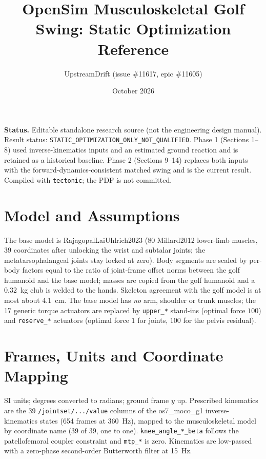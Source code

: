\documentclass[11pt,a4paper]{article}
\title{OpenSim Musculoskeletal Golf Swing: Static Optimization Reference}
\author{UpstreamDrift (issue \#11617, epic \#11605)}
\date{October 2026}
\begin{document}
\maketitle

\noindent\textbf{Status.} Editable standalone research source (not the engineering design manual). Result status: \texttt{STATIC\_OPTIMIZATION\_ONLY\_NOT\_QUALIFIED}. Phase 1 (Sections 1--8) used inverse-kinematics inputs and an estimated ground reaction and is retained as a historical baseline. Phase 2 (Sections 9--14) replaces both inputs with the forward-dynamics-consistent matched swing and is the current result. Compiled with \texttt{tectonic}; the PDF is not committed.

\section{Model and Assumptions}
The base model is RajagopalLaiUhlrich2023 (80 Millard2012 lower-limb muscles, 39 coordinates after unlocking the wrist and subtalar joints; the metatarsophalangeal joints stay locked at zero). Body segments are scaled by per-body factors equal to the ratio of joint-frame offset norms between the golf humanoid and the base model; masses are copied from the golf humanoid and a $0.32$~kg club is welded to the hands. Skeleton agreement with the golf model is at most about $4.1$~cm. The base model has \emph{no} arm, shoulder or trunk muscles; the 17 generic torque actuators are replaced by \texttt{upper\_*} stand-ins (optimal force $100$) and \texttt{reserve\_*} actuators (optimal force $1$ for joints, $100$ for the pelvis residual).

\section{Frames, Units and Coordinate Mapping}
SI units; degrees converted to radians; ground frame $y$ up. Prescribed kinematics are the 39 \texttt{/jointset/.../value} columns of the os7\_moco\_g1 inverse-kinematics states (654 frames at 360~Hz), mapped to the musculoskeletal model by coordinate name (39 of 39, one to one). \texttt{knee\_angle\_*\_beta} follows the patellofemoral coupler constraint and \texttt{mtp\_*} is zero. Kinematics are low-passed with a zero-phase second-order Butterworth filter at 15~Hz.
\end{document}
